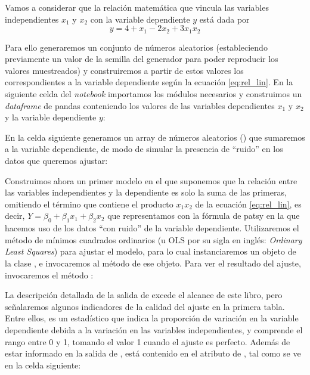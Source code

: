 Vamos a considerar que la relación matemática que vincula las variables independientes $x_1$ y $x_2$ con la variable dependiente $y$ está dada por
\begin{equation} \label{eq:rel_lin}
y = 4 + x_1 - 2 x_2 + 3 x_1 x_2
 \end{equation}

Para ello generaremos un conjunto de números aleatorios (estableciendo previamente un valor de la semilla del generador para poder reproducir los valores muestreados) y construiremos a partir de estos valores los correspondientes a la variable dependiente según la ecuación \eqref{eq:rel_lin}. En la siguiente  celda del \textit{notebook} importamos los módulos necesarios y construimos un \textit{dataframe} de pandas conteniendo los valores de las variables dependientes $x_1$ y $x_2$ y la variable dependiente $y$:


En la celda siguiente generamos un array de números aleatorios () que sumaremos a la variable dependiente, de modo de simular la presencia de ``ruido'' en los datos que queremos ajustar:


Construimos ahora un primer modelo en el que suponemos que la relación entre las variables independientes y la dependiente es solo la suma de las primeras, omitiendo el término que contiene el producto $x_1 x_2$ de la ecuación \eqref{eq:rel_lin}, es decir, $Y = \beta_0 + \beta_1 x_1 + \beta_2 x_2$ que representamos con la fórmula de patsy  en la que hacemos uso de los datos ``con ruido'' de la variable dependiente. Utilizaremos el método de mínimos cuadrados ordinarios (u OLS por su sigla en inglés: \textit{Ordinary Least Squares}) para ajustar el modelo, para lo cual instanciaremos un objeto  de la clase , e invocaremos al método  de ese objeto. Para ver el resultado del ajuste, invocaremos el método :


La descripción detallada de la salida de  excede el alcance de este libro, pero señalaremos algunos indicadores de la calidad del ajuste en la primera tabla. Entre ellos,  es un estadístico que indica la proporción de variación en la variable dependiente debida a la variación en las variables independientes, y comprende el rango entre 0 y 1, tomando el valor 1 cuando el ajuste es perfecto. Además de estar informado en la salida de , está contenido en el atributo  de , tal como se ve en la celda siguiente:

